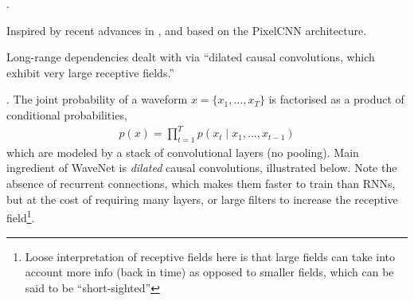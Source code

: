 \documentclass[11pt]{article}
\begin{document}
\label{Generative Models}




\myspace
\p {}. 
\begin{compactitem}
	\item Inspired by recent advances in , and based on the PixelCNN architecture.  
	
	\item Long-range dependencies dealt with via ``dilated causal convolutions, which exhibit very large receptive fields.''
\end{compactitem}

\myspace
\p {}. The joint probability of a waveform $x = \{x_1, \ldots, x_T\}$ is factorised as a product of conditional probabilities, 
\begin{align}
p(x) = \prod_{t = 1}^{T} p(x_t \mid x_1, \ldots, x_{t - 1})
\end{align}
which are modeled by a stack of convolutional layers (no pooling). Main ingredient of WaveNet is \textit{dilated} causal convolutions, illustrated below. Note the absence of recurrent connections, which makes them faster to train than RNNs, but at the cost of requiring many layers,  or large filters to increase the receptive field\footnote{Loose interpretation of receptive fields here is that large fields can take into account more info (back in time) as opposed to smaller fields, which can be said to be ``short-sighted''}. 

\end{document}

